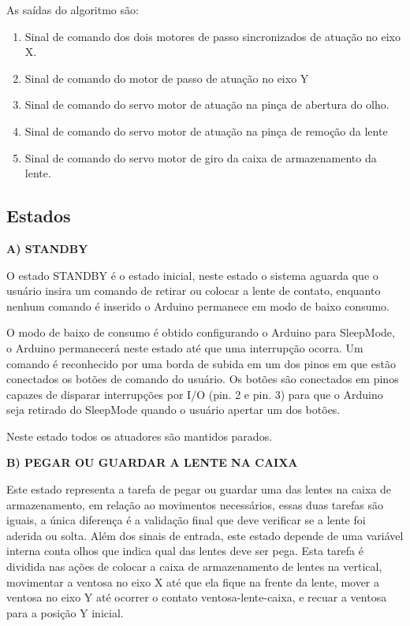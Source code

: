 As saídas do algoritmo são:
\begin{enumerate}
\item Sinal de comando dos dois motores de passo sincronizados de atuação no eixo X. 
\item Sinal de comando do motor de passo de atuação no eixo Y
\item Sinal de comando do servo motor de atuação na pinça de abertura do olho. 
\item Sinal de comando do servo motor de atuação na pinça de remoção da lente
\item Sinal de comando do servo motor de giro da caixa de armazenamento da lente. 
\end{enumerate}


\subsection{Estados}

\textbf{A)	STANDBY}

O estado STANDBY é o estado inicial, neste estado o sistema aguarda que o usuário insira um comando de retirar ou colocar a lente de contato, enquanto nenhum comando é inserido o Arduino permanece em modo de baixo consumo. 

O modo de baixo de consumo é obtido configurando o Arduino para SleepMode, o Arduino permanecerá neste estado até que uma interrupção ocorra. Um comando é reconhecido por uma borda de subida em um dos pinos em que estão conectados os botões de comando do usuário. Os botões são conectados em pinos capazes de disparar interrupções por I/O (pin. 2 e pin. 3) para que o Arduino seja retirado do SleepMode quando o usuário apertar um dos botões.

Neste estado todos os atuadores são mantidos parados.


\textbf{B)	PEGAR OU GUARDAR A LENTE NA CAIXA}

Este estado representa a tarefa de pegar ou guardar uma das lentes na caixa de armazenamento, em relação ao movimentos necessários, essas duas tarefas são iguais, a única diferença é a validação final que deve verificar se a lente foi aderida ou solta. Além dos sinais de entrada, este estado depende de uma variável interna conta olhos que indica qual das lentes deve ser pega. Esta tarefa é dividida nas ações de colocar a caixa de armazenamento de lentes na vertical, movimentar a ventosa no eixo X até que ela fique na frente da lente, mover a ventosa no eixo Y até ocorrer o contato ventosa-lente-caixa, e recuar a ventosa para a posição Y inicial.


